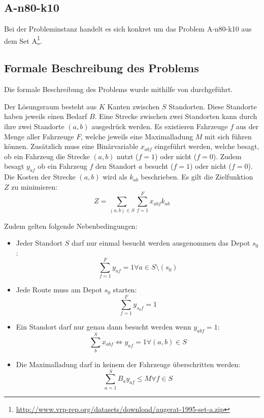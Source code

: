 \documentclass{IEEEtran}
\begin{document}
    \subsection{A-n80-k10}
    Bei der Probleminstanz handelt es sich konkret um das Problem A-n80-k10 aus dem Set A\footnote{\url{http://www.vrp-rep.org/datasets/download/augerat-1995-set-a.zip}}. 

    \subsection{Formale Beschreibung des Problems}
    Die formale Beschreibung des Problems wurde mithilfe von \cite{tothVigo2002} durchgeführt.

    Der Lösungsraum besteht aus $K$ Kanten zwischen $S$ Standorten. Diese Standorte haben jeweils einen Bedarf $B$.
    Eine Strecke zwischen zwei Standorten kann durch ihre zwei Standorte $(a,b)$ ausgedrück werden.
    Es existieren Fahrzeuge $f$ aus der Menge aller Fahrzeuge $F$, welche jeweils eine Maximalladung $M$ mit sich führen können.
    Zusätzlich muss eine Binärvariable $x_{abf}$ eingeführt werden, welche besagt, ob ein Fahrzeug die Strecke $(a,b)$ nutzt ($f=1$) oder nicht ($f=0$).
    Zudem besagt $y_{af}$ ob ein Fahrzeug $f$ den Standort $a$ besucht ($f=1$) oder nicht ($f=0$).
    Die Kosten der Strecke $(a,b)$ wird als $k_{ab}$ beschrieben.
    Es gilt die Zielfunktion $Z$ zu minimieren: 
    \[Z = \sum_{(a,b)\in S} \sum _{f=1} ^F x_{abf} k_{ab}\]

    Zudem gelten folgende Nebenbedingungen:
    \begin{itemize}
        \item Jeder Standort $S$ darf nur einmal besucht werden ausgenommen das Depot $s_0$ :
        \[ \sum_{f=1} ^F y_{a f} =1 \forall a \in S\setminus (s_0) \]

        \item Jede Route muss am Depot $s_0$ starten:
        \[\sum_{f=1}^{F} y_{s_0f} =1\]

        \item Ein Standort darf nur genau dann besucht werden wenn $y_{abf} = 1$:
        \[ \sum_{b}^{S} x_{abf} \iff y_{af}=1 \forall (a,b) \in S \]

        \item Die Maximalladung darf in keinem der Fahrzeuge überschritten werden:
        \[\sum_{a=1}^{S} B_{a}y_{af} \leq M \forall f \in S \]
    \end{itemize}
\end{document}

